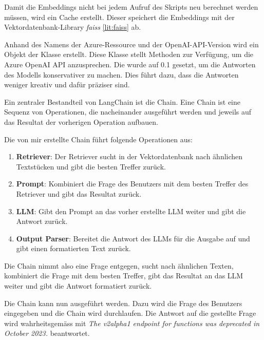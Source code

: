 \documentclass{bpraxis}
\begin{document}
Damit die Embeddings nicht bei jedem Aufruf des Skripts neu berechnet werden müssen, wird ein Cache erstellt. Dieser speichert die Embeddings mit der Vektordatenbank-Library \textit{faiss} \ref{lit:faiss} ab.


Anhand des Namens der Azure-Ressource und der OpenAI-API-Version wird ein Objekt der Klasse  erstellt. Diese Klasse stellt Methoden zur Verfügung, um die Azure OpenAI API anzusprechen.
Die  wurde auf 0.1 gesetzt, um die Antworten des Modells konservativer zu machen. Dies führt dazu, dass die Antworten weniger kreativ und dafür präziser sind.


Ein zentraler Bestandteil von LangChain ist die Chain. Eine Chain ist eine Sequenz von Operationen, die nacheinander ausgeführt werden und jeweils auf das Resultat der vorherigen Operation aufbauen.

\newpage
Die von mir erstellte Chain führt folgende Operationen aus:
\begin{enumerate}
  \item \textbf{Retriever}: Der Retriever sucht in der Vektordatenbank nach ähnlichen Textstücken und gibt die besten Treffer zurück.
  \item \textbf{Prompt}: Kombiniert die Frage des Benutzers mit dem besten Treffer des Retriever und gibt das Resultat zurück.
  \item \textbf{LLM}: Gibt den Prompt an das vorher erstellte LLM weiter und gibt die Antwort zurück.
  \item \textbf{Output Parser}: Bereitet die Antwort des LLMs für die Ausgabe auf und gibt einen formatierten Text zurück.
\end{enumerate}

Die Chain nimmt also eine Frage entgegen, sucht nach ähnlichen Texten, kombiniert die Frage mit dem besten Treffer, gibt das Resultat an das LLM weiter und gibt die Antwort formatiert zurück.


Die Chain kann nun ausgeführt werden. Dazu wird die Frage des Benutzers eingegeben und die Chain wird durchlaufen. Die Antwort auf die gestellte Frage wird wahrheitsgemäss mit
\textit{The v2alpha1 endpoint for functions was deprecated in October 2023.} beantwortet.
\end{document}
